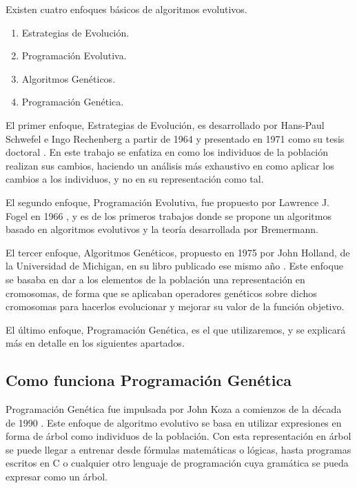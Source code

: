 Existen cuatro enfoques básicos de algoritmos evolutivos.

\begin{enumerate}
	\item Estrategias de Evolución.
	\item Programación Evolutiva.
	\item Algoritmos Genéticos.
	\item Programación Genética.
\end{enumerate}

El primer enfoque, Estrategias de Evolución, es desarrollado por Hans-Paul Schwefel e Ingo Rechenberg a partir de 1964 y presentado en 1971 como su tesis doctoral \cite{estrategiasEvolucion}. En este trabajo se enfatiza en como los individuos de la población realizan sus cambios, haciendo un análisis más exhaustivo en como aplicar los cambios a los individuos, y no en su representación como tal.

El segundo enfoque, Programación Evolutiva, fue propuesto por Lawrence J. Fogel en 1966 \cite{programacionEvolutiva}, y es de los primeros trabajos donde se propone un algoritmos basado en algoritmos evolutivos y la teoría desarrollada por Bremermann.

El tercer enfoque, Algoritmos Genéticos, propuesto en 1975 por John Holland, de la Universidad de Michigan, en su libro publicado ese mismo año \cite{libroAlgoritmosGeneticos}. Este enfoque se basaba en dar a los elementos de la población una representación en cromosomas, de forma que se aplicaban operadores genéticos sobre dichos cromosomas para hacerlos evolucionar y mejorar su valor de la función objetivo.

El último enfoque, Programación Genética, es el que utilizaremos, y se explicará más en detalle en los siguientes apartados.


\subsection{Como funciona Programación Genética}

Programación Genética fue impulsada por John Koza a comienzos de la década de 1990 \cite{kozaGP}. Este enfoque de algoritmo evolutivo se basa en utilizar expresiones en forma de árbol como individuos de la población. Con esta representación en árbol se puede llegar a entrenar desde fórmulas matemáticas o lógicas, hasta programas escritos en C o cualquier otro lenguaje de programación cuya gramática se pueda expresar como un árbol.


